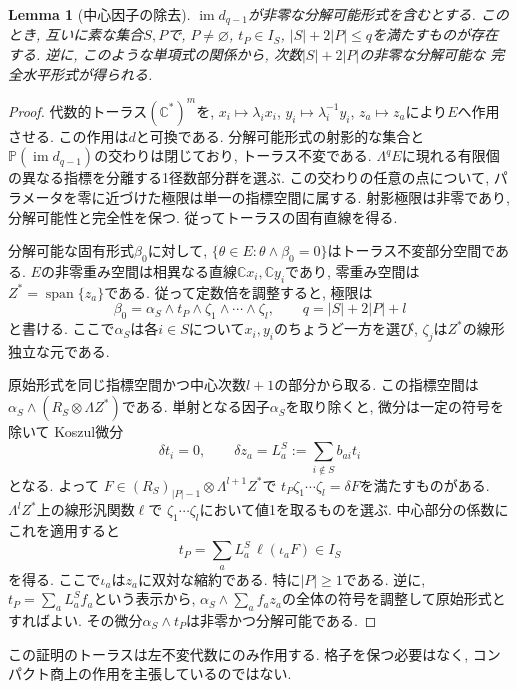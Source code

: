\documentclass[12pt]{amsart}
\newcommand{\lemword}{Lemma}
\newtheorem{lem}[thm]{\lemword}
\theoremstyle{definition}
\theoremstyle{remark}
\numberwithin{equation}{section}
\newcommand{\C}{\mathbb{C}}
\begin{document}
\begin{lem}[中心因子の除去]\label{ja:reduction}
$\operatorname{im}d_{q-1}$が非零な分解可能形式を含むとする.
このとき, 互いに素な集合$S,P$で, $P\ne\varnothing$,
$t_P\in I_S$, $|S|+2|P|\leq q$を満たすものが存在する.
逆に, このような単項式の関係から, 次数$|S|+2|P|$の非零な分解可能な
完全水平形式が得られる.
\end{lem}
\begin{proof}
代数的トーラス$(\C^*)^m$を,
$x_i\mapsto\lambda_i x_i$, $y_i\mapsto\lambda_i^{-1}y_i$,
$z_a\mapsto z_a$により$E$へ作用させる. この作用は$d$と可換である.
分解可能形式の射影的な集合と
$\mathbb P(\operatorname{im}d_{q-1})$の交わりは閉じており, トーラス不変である.
$\Lambda^qE$に現れる有限個の異なる指標を分離する1径数部分群を選ぶ.
この交わりの任意の点について, パラメータを零に近づけた極限は単一の指標空間に属する.
射影極限は非零であり, 分解可能性と完全性を保つ.
従ってトーラスの固有直線を得る.

分解可能な固有形式$\beta_0$に対して,
$\{\theta\in E:\theta\wedge\beta_0=0\}$はトーラス不変部分空間である.
$E$の非零重み空間は相異なる直線$\C x_i,\C y_i$であり,
零重み空間は$Z^*=\operatorname{span}\{z_a\}$である.
従って定数倍を調整すると, 極限は
\begin{equation}\label{ja:fixed-form}
 \beta_0=\alpha_S\wedge t_P\wedge\zeta_1\wedge\cdots\wedge\zeta_l,
 \qquad q=|S|+2|P|+l
\end{equation}
と書ける. ここで$\alpha_S$は各$i\in S$について$x_i,y_i$のちょうど一方を選び,
$\zeta_j$は$Z^*$の線形独立な元である.

原始形式を同じ指標空間かつ中心次数$l+1$の部分から取る.
この指標空間は$\alpha_S\wedge(R_S\otimes\Lambda Z^*)$である.
単射となる因子$\alpha_S$を取り除くと, 微分は一定の符号を除いて
Koszul微分
\[
 \delta t_i=0,\qquad \delta z_a=L_a^S:=\sum_{i\notin S}b_{ai}t_i
\]
となる. よって
$F\in(R_S)_{|P|-1}\otimes\Lambda^{l+1}Z^*$で
$t_P\zeta_1\cdots\zeta_l=\delta F$を満たすものがある.
$\Lambda^lZ^*$上の線形汎関数$\ell$で
$\zeta_1\cdots\zeta_l$において値1を取るものを選ぶ.
中心部分の係数にこれを適用すると
\[
 t_P=\sum_a L_a^S\,\ell(\iota_a F)\in I_S
\]
を得る. ここで$\iota_a$は$z_a$に双対な縮約である.
特に$|P|\geq1$である.
逆に, $t_P=\sum_a L_a^Sf_a$という表示から,
$\alpha_S\wedge\sum_a f_a z_a$の全体の符号を調整して原始形式とすればよい.
その微分$\alpha_S\wedge t_P$は非零かつ分解可能である.
\end{proof}

この証明のトーラスは左不変代数にのみ作用する.
格子を保つ必要はなく, コンパクト商上の作用を主張しているのではない.
\end{document}
